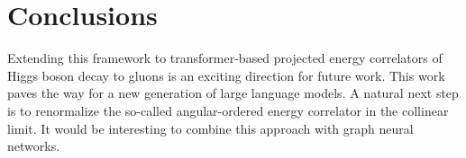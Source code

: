 \section{Conclusions}\label{sec:conclusions}

Extending this framework to transformer-based projected energy
correlators of Higgs boson decay to gluons is an exciting direction for
future work. This work paves the way for a new generation of large
language models. A natural next step is to renormalize the so-called
angular-ordered energy correlator in the collinear limit. It would be
interesting to combine this approach with graph neural networks.

